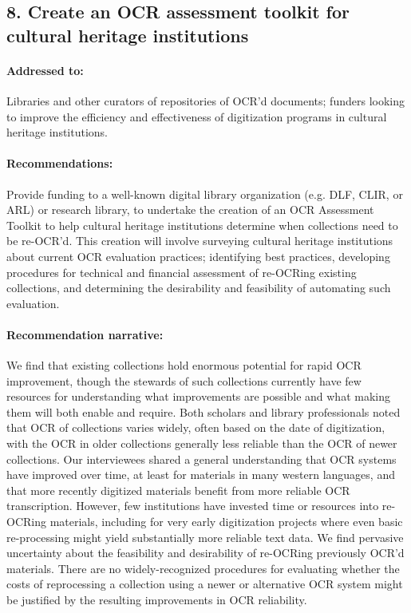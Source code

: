\documentclass[twoside,11pt]{report}
\begin{document}
\subsection{8. Create an OCR assessment toolkit for cultural heritage institutions}
\label{sec:rec-assessment}

\paragraph{Addressed to:} Libraries and other curators of repositories of OCR'd documents; funders looking to improve the efficiency and effectiveness of digitization programs in cultural heritage institutions.

\paragraph{Recommendations:} Provide funding to a well-known digital library organization (e.g. DLF, CLIR, or ARL) or research library, to undertake the creation of an OCR Assessment Toolkit to help cultural heritage institutions determine when collections need to be re-OCR'd. This creation will involve surveying cultural heritage institutions about current OCR evaluation practices; identifying best practices, developing procedures for technical and financial assessment of re-OCRing existing collections, and determining the desirability and feasibility of automating such evaluation.

\paragraph{Recommendation narrative:}

We find that existing collections hold enormous potential for rapid OCR improvement, though the stewards of such collections currently have few resources for understanding what improvements are possible and what making them will both enable and require. Both scholars and library professionals noted that OCR of collections varies widely, often based on the date of digitization, with the OCR in older collections generally less reliable than the OCR of newer collections. Our interviewees shared a general understanding that OCR systems have improved over time, at least for materials in many western languages, and that more recently digitized materials benefit from more reliable OCR transcription. However, few institutions have invested time or resources into re-OCRing materials, including for very early digitization projects where even basic re-processing might yield substantially more reliable text data. We find pervasive uncertainty about the feasibility and desirability of re-OCRing previously OCR'd materials. There are no widely-recognized procedures for evaluating whether the costs of reprocessing a collection using a newer or alternative OCR system might be justified by the resulting improvements in OCR reliability.
\end{document}
